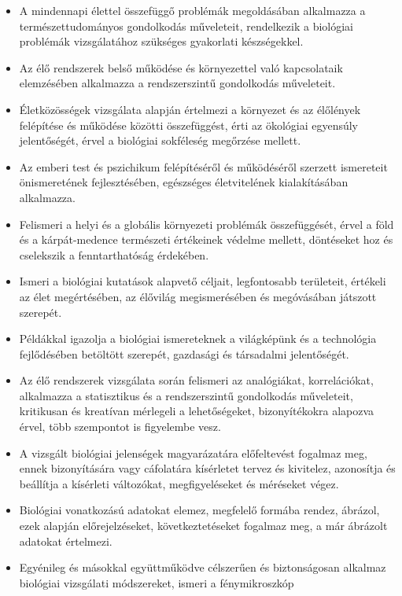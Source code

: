 \begin{itemize}
\item
  A mindennapi élettel összefüggő problémák megoldásában alkalmazza a
  természettudományos gondolkodás műveleteit, rendelkezik a biológiai
  problémák vizsgálatához szükséges gyakorlati készségekkel.
\item
  Az élő rendszerek belső működése és környezettel való kapcsolataik
  elemzésében alkalmazza a rendszerszintű gondolkodás műveleteit.
\item
  Életközösségek vizsgálata alapján értelmezi a környezet és az
  élőlények felépítése és működése közötti összefüggést, érti az
  ökológiai egyensúly jelentőségét, érvel a biológiai sokféleség
  megőrzése mellett.
\item
  Az emberi test és pszichikum felépítéséről és működéséről szerzett
  ismereteit önismeretének fejlesztésében, egészséges életvitelének
  kialakításában alkalmazza.
\item
  Felismeri a helyi és a globális környezeti problémák összefüggését,
  érvel a föld és a kárpát-medence természeti értékeinek védelme
  mellett, döntéseket hoz és cselekszik a fenntarthatóság érdekében.
\item
  Ismeri a biológiai kutatások alapvető céljait, legfontosabb
  területeit, értékeli az élet megértésében, az élővilág megismerésében
  és megóvásában játszott szerepét.
\item
  Példákkal igazolja a biológiai ismereteknek a világképünk és a
  technológia fejlődésében betöltött szerepét, gazdasági és társadalmi
  jelentőségét.
\item
  Az élő rendszerek vizsgálata során felismeri az analógiákat,
  korrelációkat, alkalmazza a statisztikus és a rendszerszintű
  gondolkodás műveleteit, kritikusan és kreatívan mérlegeli a
  lehetőségeket, bizonyítékokra alapozva érvel, több szempontot is
  figyelembe vesz.
\item
  A vizsgált biológiai jelenségek magyarázatára előfeltevést fogalmaz
  meg, ennek bizonyítására vagy cáfolatára kísérletet tervez és
  kivitelez, azonosítja és beállítja a kísérleti változókat,
  megfigyeléseket és méréseket végez.
\item
  Biológiai vonatkozású adatokat elemez, megfelelő formába rendez,
  ábrázol, ezek alapján előrejelzéseket, következtetéseket fogalmaz meg,
  a már ábrázolt adatokat értelmezi.
\item
  Egyénileg és másokkal együttműködve célszerűen és biztonságosan
  alkalmaz biológiai vizsgálati módszereket, ismeri a fénymikroszkóp

\end{itemize}
